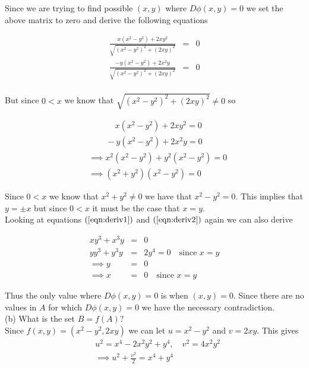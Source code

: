 \documentclass[11pt,reqno]{article}
\begin{document}
Since we are trying to find possible $(x,y)$ where $D \phi(x,y) = 0$ we set the above matrix to zero and derive the following equations

\begin{eqnarray*}
\frac{x(x^2 - y^2) + 2 x y^2}{\sqrt{(x^2 - y^2)^2 + (2 x y)^2}} &=& 0\\
\frac{-y(x^2 - y^2) + 2 x^2 y}{\sqrt{(x^2 - y^2)^2 + (2 x y)^2}} &=& 0\\
\end{eqnarray*}

\noindent But since $0 < x$ we know that $\sqrt{(x^2 - y^2)^2 + (2 x y)^2} \neq 0$ so 

\begin{align}
&\hspace{38pt}x(x^2 - y^2) + 2 x y^2 = 0 \label{eqn:deriv1}\\
&\hspace{25pt}-y(x^2 - y^2) + 2 x^2 y = 0 \label{eqn:deriv2}\\
&\implies x^2 (x^2 - y^2) + y^2 (x^2 - y^2 ) = 0 \nonumber \\
&\implies (x^2 + y^2) (x^2 - y^2) = 0 \nonumber
\end{align}

Since $0 < x$ we know that $x^2 + y^2 \neq 0$ we have that $x^2 - y^2 = 0$. This implies that $y = \pm x$ but since $0 < x$ it must be the case that $x = y$.\\
Looking at equations $(\ref{eqn:deriv1})$ and $(\ref{eqn:deriv2})$ again we can also derive

\begin{eqnarray*} 
x y^3 + x^3 y &=& 0 \\
y y^3 + y^3 y &=& 2 y^4 = 0 \quad \text{since $x = y$}\\
\implies y &=& 0\\
\implies x &=& 0 \quad \text{since $x = y$}
\end{eqnarray*}

Thus the only value where $D \phi(x,y) = 0$ is when $(x,y) = 0$. Since there are no values in $A$ for which $D \phi(x,y) = 0$ we have the necessary contradiction.\\

\noindent (b) What is the set $B = f(A)$?\\

\noindent Since $f(x,y) = (x^2 - y^2, 2 x y)$ we can let $u = x^2 - y^2$ and $v = 2 x y$. This gives
\begin{align*}
&u^2 = x^4 - 2 x^2 y^2 + y^4, \quad v^2 = 4 x^2 y^2 \\
&\implies u^2  + \frac{v^2}{2} = x^4 + y^4\\
\end{align*}
\end{document}
